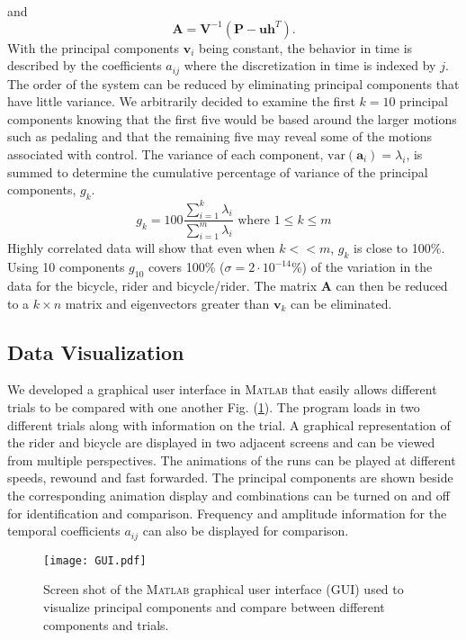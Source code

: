 and
\begin{equation}
    \mathbf{A}=\mathbf{V}^{-1}(\mathbf{P}-\mathbf{u}\mathbf{h}^T)\textrm{.}
\end{equation}
With the principal components $\mathbf{v}_i$ being constant, the behavior in time is described by the coefficients $a_{ij}$ where the discretization in time is indexed by $j$. The order of the system can be reduced by eliminating principal components that have little variance. We arbitrarily decided to examine the first $k=10$ principal components knowing that the first five would be based around the larger motions such as pedaling and that the remaining five may reveal some of the motions associated with control. The variance of each component, $\textrm{var}(\mathbf{a}_i)=\lambda_i$, is summed to determine the cumulative percentage of variance of the principal components, $g_k$.
\begin{equation}
    g_k=100\frac{\sum_{i=1}^k\lambda_i}{\sum_{i=1}^m\lambda_i}\textrm{ where }1\leq k\leq m
\end{equation}
Highly correlated data will show that even when $k<<m$, $g_k$ is close to 100\%. Using 10 components $g_{10}$ covers 100\% ($\sigma=2\cdot10^{-14}$\%) of the variation in the data for the bicycle, rider and bicycle/rider. The matrix $\mathbf{A}$ can then be reduced to a $k\times n$ matrix and eigenvectors greater than $\mathbf{v}_k$ can be eliminated.

\subsection{Data Visualization}
\label{sec:dataVis}
We developed a graphical user interface in \textsc{Matlab} that easily allows different trials to be compared with one another Fig. (\ref{fig:GUI}). The program loads in two different trials along with information on the trial. A graphical representation of the rider and bicycle are displayed in two adjacent screens and can be viewed from multiple perspectives. The animations of the runs can be played at different speeds, rewound and fast forwarded. The principal components are shown beside the corresponding animation display and combinations can be turned on and off for identification and comparison. Frequency and amplitude information for the temporal coefficients $a_{ij}$ can also be displayed for comparison.
\begin{figure}[]
    \begin{center}
        \texttt{[image: GUI.pdf]}
    \end{center}
    \caption{Screen shot of the \textsc{Matlab} graphical user interface (GUI) used to visualize principal components and compare between different components and trials.}
    \label{fig:GUI}
\end{figure}

